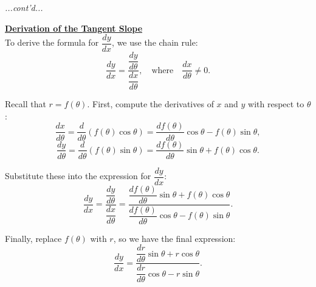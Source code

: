 \documentclass{article}
\begin{document}
\begin{theorembox}
    \textit{...cont'd...}
    
    \begin{conceptbox}
        \textbf{\underline{Derivation of the Tangent Slope}} \\
        
        To derive the formula for \( \dfrac{dy}{dx} \), we use the chain rule:
        \[
            \dfrac{dy}{dx} = \dfrac{\dfrac{dy}{d\theta}}{\dfrac{dx}{d\theta}}, \quad \text{where} \quad \dfrac{dx}{d\theta} \neq 0.
        \]
        
        Recall that \( r = f(\theta) \). First, compute the derivatives of \( x \) and \( y \) with respect to \( \theta \):
        \[
            \frac{dx}{d\theta} = \frac{d}{d\theta} \left( f(\theta) \cos\theta \right) = \frac{df(\theta)}{d\theta} \cos\theta - f(\theta) \sin\theta,
        \]
        \[
            \frac{dy}{d\theta} = \frac{d}{d\theta} \left( f(\theta) \sin\theta \right) = \frac{df(\theta)}{d\theta} \sin\theta + f(\theta) \cos\theta.
        \]
        
        Substitute these into the expression for \( \dfrac{dy}{dx} \):
        \[
            \frac{dy}{dx} = \dfrac{\dfrac{dy}{d\theta}}{\dfrac{dx}{d\theta}} = \dfrac{\dfrac{df(\theta)}{d\theta} \sin\theta + f(\theta) \cos\theta}{\dfrac{df(\theta)}{d\theta} \cos\theta - f(\theta) \sin\theta}.
        \]
        
        Finally, replace \( f(\theta) \) with \( r \), so we have the final expression:
        \LARGE
        \[
            \dfrac{dy}{dx} = \dfrac{\dfrac{dr}{d\theta} \sin\theta + r \cos\theta}{\dfrac{dr}{d\theta} \cos\theta - r \sin\theta}.
        \]
        \normalsize
        \end{conceptbox}
\end{theorembox}
\end{document}
